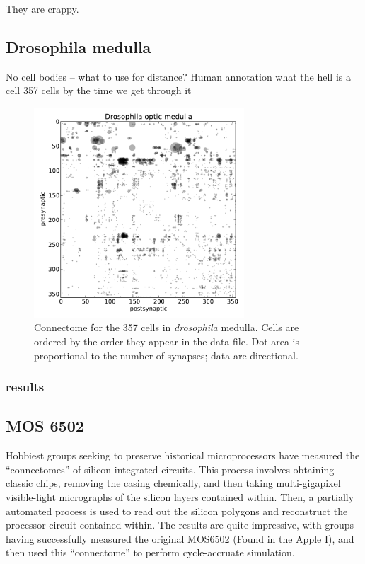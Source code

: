 \documentclass{article}
\begin{document}
They are crappy. 



\subsection{Drosophila medulla}
\autocite{Takemura2013}
No cell bodies -- what to use for distance? 
Human annotation
what the hell is a cell
357 cells by the time we get through it

\begin{figure}
  \centering 
  \includegraphics[width=0.7\textwidth]{drosophila/adj_comp.pdf}
  \caption{Connectome for the 357 cells in \textit{drosophila} medulla. Cells are ordered by the order they appear in the data file. Dot area is proportional to the number of synapses; data are directional.}
  \label{fig:drosophila_adj}
\end{figure}

\subsubsection{results}

\subsection{MOS 6502}

Hobbiest groups seeking to preserve historical microprocessors have
measured the ``connectomes'' of silicon integrated circuits. This
process involves obtaining classic chips, removing the casing
chemically, and then taking multi-gigapixel visible-light micrographs
of the silicon layers contained within. Then, a partially automated
process is used to read out the silicon polygons and reconstruct the
processor circuit contained within. The results are quite impressive,
with groups having successfully measured the original MOS6502 (Found
in the Apple I), and then used this ``connectome'' to perform
cycle-accruate simulation.
\end{document}
